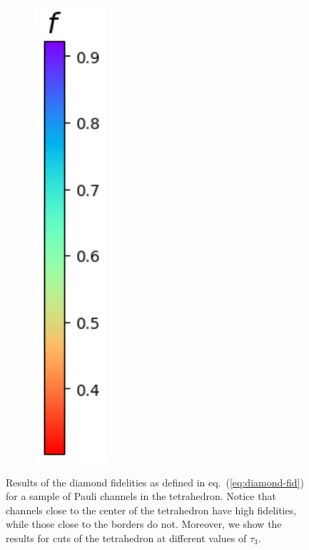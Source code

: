 \documentclass[10pt,letterpaper]{article} %
\newcommand{\eref}[1]{eq.~(\ref{#1})}
\begin{document}
\begin{figure}
\begin{subfigure}{0.9\textwidth}
\end{subfigure}%
\begin{subfigure}{0.1\textwidth}
\includegraphics[width=.8\columnwidth]{images/col-2.png} \\ [2ex]
\end{subfigure}
\caption{Results of the diamond fidelities as defined in \eref{eq:diamond-fid}
for a sample of Pauli channels in the tetrahedron.  Notice that channels close
to the center of the tetrahedron have high fidelities, while those close to the
borders do not.  Moreover, we show the results for cuts of the tetrahedron at
different values of $\tau_3$.}
\label{fig:fids}
\end{figure} %
\end{document}
